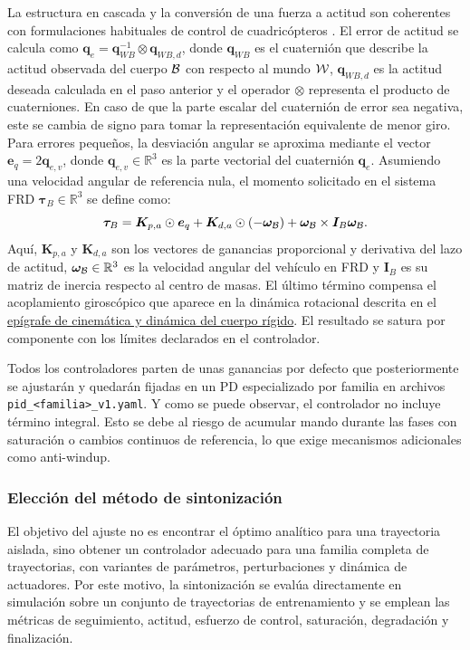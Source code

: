 La estructura en cascada y la conversión de una fuerza a actitud son
coherentes con formulaciones habituales de control de cuadricópteros
\cite{beard2012small,mellinger2011minimum}.
El error de actitud se calcula como
$\bm{q}_e=\bm{q}_{WB}^{-1}\otimes\bm{q}_{WB,d}$, donde $\bm{q}_{WB}$ es el
cuaternión que describe la actitud observada del cuerpo $\mathcal{B}$ con respecto
al mundo $\mathcal{W}$, $\bm{q}_{WB,d}$ es la actitud deseada calculada en el paso
anterior y el operador $\otimes$ representa el producto de cuaterniones. En caso de
que la parte escalar del cuaternión de error sea negativa, este se cambia de signo para tomar la
representación equivalente de menor giro. Para errores pequeños, la desviación angular se
aproxima mediante el vector $\bm{e}_q=2\bm{q}_{e,v}$, donde $\bm{q}_{e,v} \in \mathbb{R}^3$ es la
parte vectorial del cuaternión $\bm{q}_e$. Asumiendo una velocidad angular
de referencia nula, el momento solicitado en el sistema FRD $\bm{\tau}_B \in \mathbb{R}^3$
se define como:
\begin{equation}
 \bm{\tau}_B=
 \bm{K}_{p,a}\odot\bm{e}_q
 +\bm{K}_{d,a}\odot(-\bm{\omega}_{\mathcal{B}})
 +\bm{\omega}_{\mathcal{B}}\times\bm{I}_B\bm{\omega}_{\mathcal{B}}.
 \label{eq:pd-actitud}
\end{equation}
Aquí, $\bm{K}_{p,a}$ y $\bm{K}_{d,a}$ son los vectores de ganancias proporcional y
derivativa del lazo de actitud, $\bm{\omega}_{\mathcal{B}} \in \mathbb{R}^3$ es la velocidad angular
del vehículo en FRD y $\bm{I}_B$ es su matriz de inercia respecto al centro de masas. El
último término compensa el acoplamiento giroscópico que aparece en la dinámica
rotacional descrita en el \hyperref[subsubsec:cinematica-dinamica-cuerpo]{epígrafe de cinemática y dinámica del cuerpo rígido}. El resultado se satura por
componente con los límites declarados en el controlador.

Todos los controladores parten de unas ganancias por defecto que posteriormente se ajustarán y quedarán
fijadas en un PD especializado por familia en archivos \texttt{pid\_<familia>\_v1.yaml}. Y como se puede
observar, el controlador no incluye término integral. Esto se debe al riesgo de acumular mando durante las fases con saturación o cambios continuos de referencia, lo que exige mecanismos adicionales como anti-windup.

\subsubsection*{Elección del método de sintonización}

El objetivo del ajuste no es encontrar el óptimo analítico para una trayectoria
aislada, sino obtener un controlador adecuado para una familia completa de
trayectorias, con variantes de parámetros, perturbaciones y dinámica de actuadores.
Por este motivo, la sintonización se evalúa directamente en simulación sobre un conjunto 
de trayectorias de entrenamiento y se emplean las métricas de seguimiento, actitud, 
esfuerzo de control, saturación, degradación y finalización.


